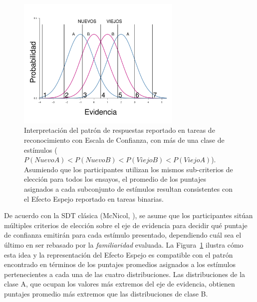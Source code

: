 \begin{itemize}
\begin{figure}[h]
\centering
\includegraphics[width=0.7\textwidth]{Figures/EfectoEspejo_Puntajes}
\caption[Efecto Espejo en tareas de detección con Escala de Confianza]{Interpretación del patrón de respuestas reportado en tareas de reconocimiento con Escala de Confianza, con más de una clase de estímulos ($P(NuevoA) < P(NuevoB) < P(ViejoB) < P(ViejoA)$). Asumiendo que los participantes utilizan los mismos sub-criterios de elección para todos los ensayos, el promedio de los puntajes asignados a cada subconjunto de estímulos resultan consistentes con el Efecto Espejo reportado en tareas binarias.}
\label{fig:Ejem_Efecto_Punt}
\end{figure}

De acuerdo con la SDT clásica (McNicol, \citeyear{McNicol2, McNicol5}), se asume que los participantes sitúan múltiples criterios de elección sobre el eje de evidencia para decidir qué puntaje de confianza emitirán para cada estímulo presentado, dependiendo cuál sea el último en ser rebasado por la \textit{familiaridad} evaluada. La Figura~\ref{fig:Ejem_Efecto_Punt} ilustra cómo esta idea y la representación del Efecto Espejo es compatible con el patrón encontrado en términos de los puntajes promedios asignados a los estímulos pertenecientes a cada una de las cuatro distribuciones. Las distribuciones de la clase A, que ocupan los valores más extremos del eje de evidencia, obtienen puntajes promedio más extremos que las distribuciones de clase B.\\




\end{itemize}
